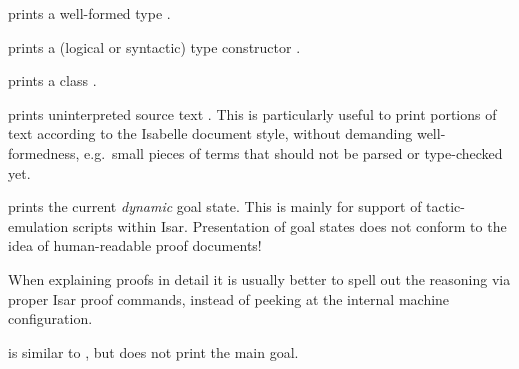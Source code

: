 \begin{isabellebody}
\begin{isamarkuptext}
\begin{description}
  \item {} prints a well-formed type .

  \item {} prints a (logical or syntactic) type
    constructor .

  \item {} prints a class .

  \item {} prints uninterpreted source text .  This is particularly useful to print portions of text according
  to the Isabelle document style, without demanding well-formedness,
  e.g.\ small pieces of terms that should not be parsed or
  type-checked yet.

  \item {} prints the current \emph{dynamic} goal
  state.  This is mainly for support of tactic-emulation scripts
  within Isar.  Presentation of goal states does not conform to the
  idea of human-readable proof documents!

  When explaining proofs in detail it is usually better to spell out
  the reasoning via proper Isar proof commands, instead of peeking at
  the internal machine configuration.
  
  \item {} is similar to , but
  does not print the main goal.
  

\end{description}
\end{isamarkuptext}
\end{isabellebody}

